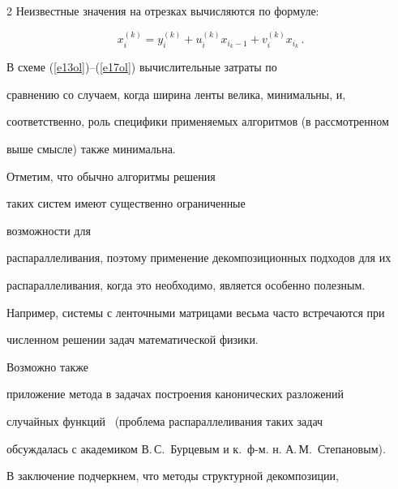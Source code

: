 \begin{multicols}{2}
     Неизвестные значения на отрезках вычисляются по формуле:


     \begin{equation}


     x_i^{(k)} = y_i^{(k)} +u_i^{(k)} x_{i_k-1} +v_i^{(k)} x_{i_k}\,.


     \label{e17ol}


     \end{equation}





     В схеме (\ref{e13ol})--(\ref{e17ol}) вычислительные затраты по


сравнению со случаем, когда ширина ленты велика, минимальны, и,


соответственно, роль специфики применяемых алгоритмов (в рассмотренном


выше смысле) также минимальна. 





Отметим, что обычно алгоритмы решения


\mbox{таких} систем имеют существенно ограниченные %


возможности для


распараллеливания, поэтому применение декомпозиционных подходов для их


распа\-рал\-ле\-ли\-ва\-ния, когда это необходимо, является особен\-но полезным.


Например, системы с ленточными матрицами весьма часто встречаются при


численном решении задач математической фи\-зики. 


{





}





Возможно также


приложение метода в задачах построения канонических разложений


случайных функций~\cite{4ol} (проблема распараллеливания таких задач


обсуждалась с академиком В.\,С.~Бурцевым и к.\ ф-м. н. А.\,М.~Степановым).





     В заключение подчеркнем, что методы структурной декомпозиции,



\end{multicols}
